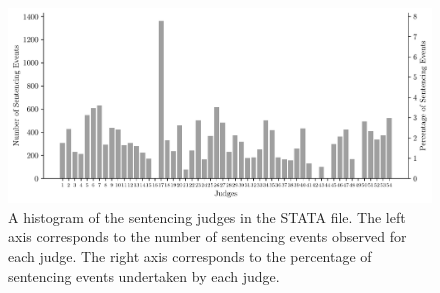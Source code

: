 \documentclass[11pt, oneside]{article}   	%
\theoremstyle{ModifiedStyle}
\begin{document}
%
\begin{figure}[h!]
	\centering
	\includegraphics[scale=0.75]{Figures/Judge_STATA_Histogram}
	\vspace{-2mm}
	\caption{A histogram of the sentencing judges in the STATA file. The left axis corresponds to the number of sentencing events observed for each judge. The right axis corresponds to the percentage of sentencing events undertaken by each judge.}
	\label{Figure_Hester_Data_STATA_Judge_Histogram}
\end{figure}
%
\end{document}
